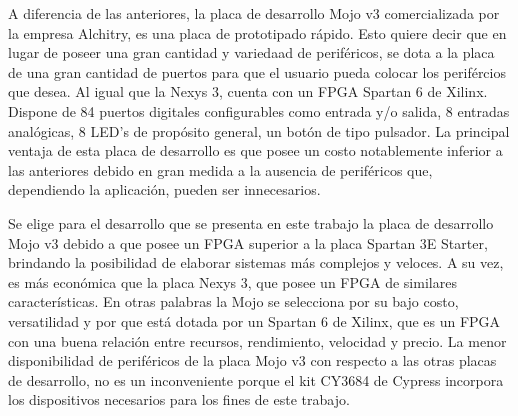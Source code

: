 A diferencia de las anteriores, la placa de desarrollo Mojo v3 comercializada por la empresa Alchitry, es una placa de prototipado rápido. Esto quiere decir que en lugar de poseer una gran cantidad y variedaad de periféricos, se dota a la placa de una gran cantidad de puertos para que el usuario pueda colocar los perifércios que desea. Al igual que la Nexys 3, cuenta con un FPGA Spartan 6 de Xilinx. Dispone de 84 puertos digitales configurables como entrada y/o salida, 8 entradas analógicas, 8 LED's de propósito general, un botón de tipo pulsador. La principal ventaja de esta placa de desarrollo es que posee un costo notablemente inferior a las anteriores debido en gran medida a la ausencia de periféricos que, dependiendo la aplicación, pueden ser innecesarios.

Se elige para el desarrollo que se presenta en este trabajo la placa de desarrollo Mojo v3 debido a que posee un FPGA superior a la placa Spartan 3E Starter, brindando la posibilidad de elaborar sistemas más complejos y veloces. A su vez, es más económica que la placa Nexys 3, que posee un FPGA de similares características. En otras palabras la Mojo se selecciona por su bajo costo, versatilidad y por que está dotada por un Spartan 6 de Xilinx, que es un FPGA con una buena relación entre recursos, rendimiento, velocidad y precio. La menor disponibilidad de periféricos de la placa Mojo v3 con respecto a las otras placas de desarrollo, no es un inconveniente porque el kit CY3684 de Cypress incorpora los dispositivos necesarios para los fines de este trabajo.
%


